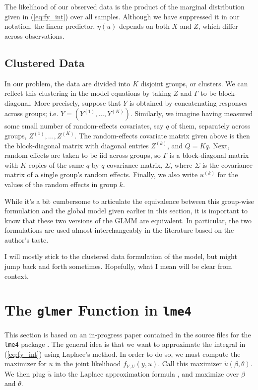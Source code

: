 \documentclass{article}
\begin{document}
The likelihood of our observed data is the product of the marginal distribution given in (\ref{eq:fy_int}) over all samples. Although we have suppressed it in our notation, the linear predictor, $\eta(u)$ depends on both $X$ and $Z$, which differ across observations. 


\subsection{Clustered Data}
In our problem, the data are divided into $K$ disjoint groups, or clusters. We can reflect this clustering in the model equations by taking $Z$ and $\Gamma$ to be block-diagonal. More precisely, suppose that $Y$ is obtained by concatenating responses across groups; i.e. $Y = (Y^{(1)}, \ldots, Y^{(K)})$. Similarly, we imagine having measured some small number of random-effects covariates, say $q$ of them, separately across groups, $Z^{(1)}, \ldots, Z^{(K)}$. The random-effects covariate matrix given above is then the block-diagonal matrix with diagonal entries $Z^{(k)}$, and $Q = Kq$. Next, random effects are taken to be iid across groups, so $\Gamma$ is a block-diagonal matrix with $K$ copies of the same $q$-by-$q$ covariance matrix, $\Sigma$, where $\Sigma$ is the covariance matrix of a single group's random effects. Finally, we also write $u^{(k)}$ for the values of the random effects in group $k$.

While it's a bit cumbersome to articulate the equivalence between this group-wise formulation and the global model given earlier in this section, it is important to know that these two versions of the GLMM are equivalent. In particular, the two formulations are used almost interchangeably in the literature based on the author's taste.

I will mostly stick to the clustered data formulation of the model, but might jump back and forth sometimes. Hopefully, what I mean will be clear from context.


\section{The \texttt{glmer} Function in \texttt{lme4}}
\label{sec:lme4}

This section is based on an in-progress paper contained in the source files for the \texttt{lme4} package \citep{Wal24}. The general idea is that we want to approximate the integral in (\ref{eq:fy_int}) using Laplace's method. In order to do so, we must compute the maximizer for $u$ in the joint likelihood $f_{Y,U}(y,u)$. Call this maximizer $\tilde{u}(\beta, \theta)$. We then plug $\tilde{u}$ into the Laplace approximation formula \citep[see, e.g., Section 7.7.1 of ][]{Dem04}, and maximize over $\beta$ and $\theta$.
\end{document}
